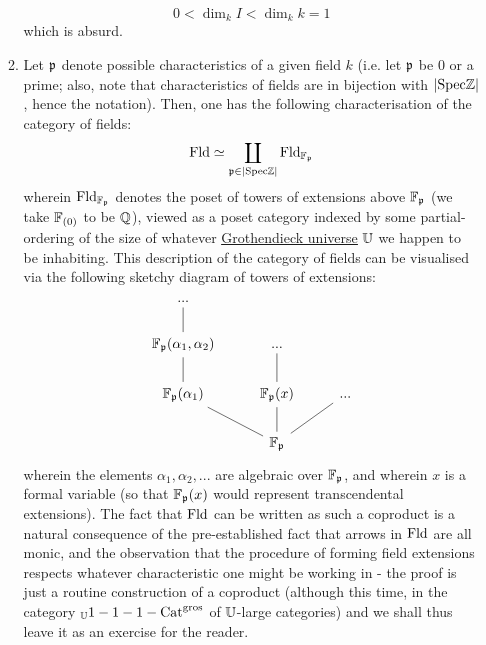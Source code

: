 \begin{example}
\begin{enumerate}
\begin{enumerate}
                                        $$0 < \dim_k I < \dim_k k = 1$$
                                    which is absurd.
                                    \item Let $\mathfrak{p}$ denote possible characteristics of a given field $k$ (i.e. let $\mathfrak{p}$ be $0$ or a prime; also, note that characteristics of fields are in bijection with $|\mathrm{Spec} \mathbb{Z}|$, hence the notation). Then, one has the following characterisation of the category of fields:
                                        $$\mathrm{Fld} \simeq \coprod_{\mathfrak{p} \in |\mathrm{Spec} \mathbb{Z}|} \mathrm{Fld}_{\mathbb{F}_{\mathfrak{p}}}$$
                                    wherein $\mathrm{Fld}_{\mathbb{F}_{\mathfrak{p}}}$ denotes the poset of towers of extensions above $\mathbb{F}_{\mathfrak{p}}$ (we take $\mathbb{F}_{(0)}$ to be $\mathbb{Q}$), viewed as a poset category indexed by some partial-ordering of the size of whatever \href{https://ncatlab.org/nlab/show/Grothendieck+universe}{\underline{Grothendieck universe}} $\mathbb{U}$ we happen to be inhabiting. This description of the category of fields can be visualised via the following sketchy diagram of towers of extensions:
                                        $$
                                            \begin{tikzcd}
                                            	{...} \\
                                            	{\F_{\p}(\alpha_1, \alpha_2)} & {...} \\
                                            	{\F_{\p}(\alpha_1)} & {\F_{\p}(x)} & {...} \\
                                            	& {\F_{\p}}
                                            	\arrow[no head, from=2-1, to=1-1]
                                            	\arrow[no head, from=3-1, to=2-1]
                                            	\arrow[no head, from=4-2, to=3-1]
                                            	\arrow[no head, from=4-2, to=3-2]
                                            	\arrow[no head, from=4-2, to=3-3]
                                            	\arrow[no head, from=3-2, to=2-2]
                                            \end{tikzcd}
                                        $$
                                    wherein the elements $\alpha_1, \alpha_2, ...$ are algebraic over $\mathbb{F}_{\mathfrak{p}}$, and wherein $x$ is a formal variable (so that $\mathbb{F}_{\mathfrak{p}}(x)$ would represent transcendental extensions). The fact that $\mathrm{Fld}$ can be written as such a coproduct is a natural consequence of the pre-established fact that arrows in $\mathrm{Fld}$ are all monic, and the observation that the procedure of forming field extensions respects whatever characteristic one might be working in - the proof is just a routine construction of a coproduct (although this time, in the category ${}_{\mathbb{U}}1-1-1-\mathrm{Cat}^{\mathrm{gros}}$ of $\mathbb{U}$-large categories) and we shall thus leave it as an exercise for the reader. 

\end{enumerate}
\end{enumerate}
\end{example}
